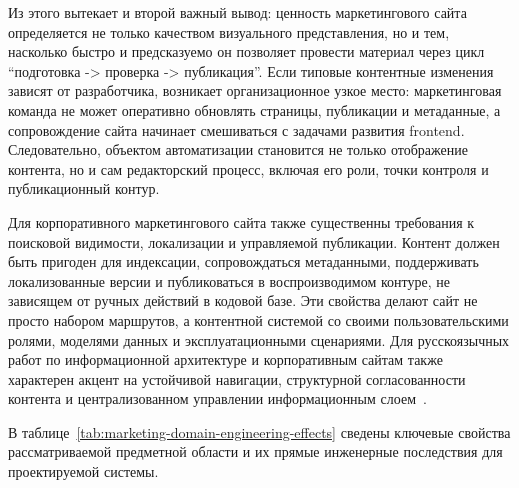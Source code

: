 Из этого вытекает и второй важный вывод: ценность маркетингового сайта определяется не
только качеством визуального представления, но и тем, насколько быстро и предсказуемо
он позволяет провести материал через цикл ``подготовка -> проверка -> публикация''.
Если типовые контентные изменения зависят от разработчика, возникает организационное
узкое место: маркетинговая команда не может оперативно обновлять страницы, публикации и
метаданные, а сопровождение сайта начинает смешиваться с задачами развития frontend.
Следовательно, объектом автоматизации становится не только отображение контента, но и
сам редакторский процесс, включая его роли, точки контроля и публикационный контур.

Для корпоративного маркетингового сайта также существенны требования к поисковой
видимости, локализации и управляемой публикации. Контент должен быть пригоден для
индексации, сопровождаться метаданными, поддерживать локализованные версии и
публиковаться в воспроизводимом контуре, не зависящем от ручных действий в кодовой
базе. Эти свойства делают сайт не просто набором маршрутов, а контентной системой со
своими пользовательскими ролями, моделями данных и эксплуатационными сценариями. Для
русскоязычных работ по
информационной архитектуре и корпоративным сайтам также характерен акцент на устойчивой
навигации, структурной согласованности контента и централизованном управлении
информационным слоем~\cite{belyaev2009website-navigation,mikhailova2016content-navigation,mashina2022centralized-cms-knowledge}.

В таблице~\ref{tab:marketing-domain-engineering-effects} сведены ключевые свойства
рассматриваемой предметной области и их прямые инженерные последствия для проектируемой
системы.

